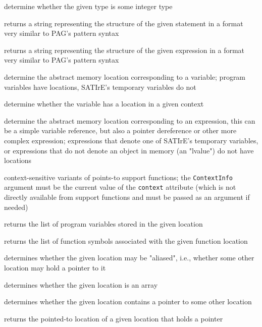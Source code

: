 \documentclass[a4paper,12pt]{report}
\begin{document}
\begin{description}
    determine whether the given type is some integer type

    returns a string representing the structure of the given statement in a
    format very similar to PAG's pattern syntax

    returns a string representing the structure of the given expression in a
    format very similar to PAG's pattern syntax

    determine the abstract memory location corresponding to a variable;
    program variables have locations, SATIrE's temporary variables do not

    determine whether the variable has a location in a given context

    determine the abstract memory location corresponding to an expression,
    this can be a simple variable reference, but also a pointer dereference
    or other more complex expression; expressions that denote one of
    SATIrE's temporary variables, or expressions that do not denote an
    object in memory (an "lvalue") do not have locations

    context-sensitive variants of points-to support functions; the
    \texttt{ContextInfo} argument must be the current value of the
    \texttt{context} attribute (which is not directly available from support
    functions and must be passed as an argument if needed)

    returns the list of program variables stored in the given location

    returns the list of function symbols associated with the given function
    location

    determines whether the given location may be "aliased", i.e., whether
    some other location may hold a pointer to it

    determines whether the given location is an array

    determines whether the given location contains a pointer to some other
    location

    returns the pointed-to location of a given location that holds a pointer
\end{description}
\end{document}
